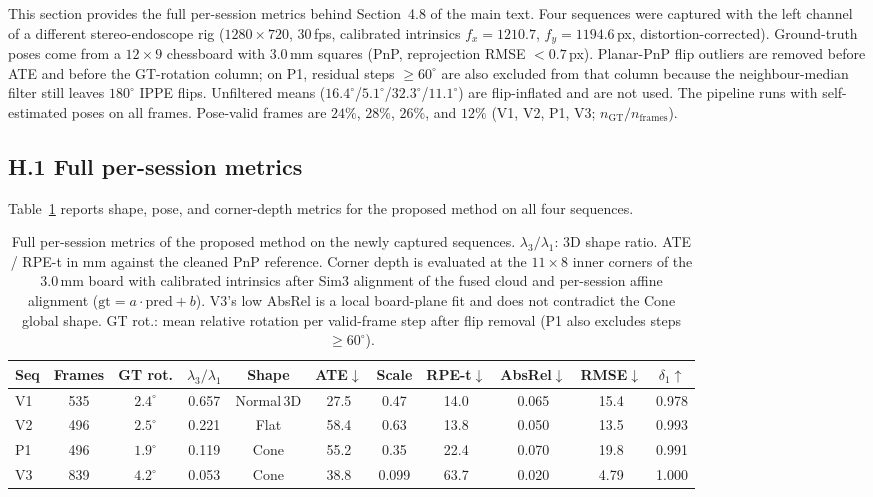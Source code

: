 \documentclass[review]{elsarticle}
\begin{document}
This section provides the full per-session metrics behind Section~4.8 of the main text. Four sequences were captured with the left channel of a different stereo-endoscope rig ($1280{\times}720$, 30\,fps, calibrated intrinsics $f_x{=}1210.7$, $f_y{=}1194.6$\,px, distortion-corrected). Ground-truth poses come from a $12{\times}9$ chessboard with $3.0$\,mm squares (PnP, reprojection RMSE ${<}0.7$\,px). Planar-PnP flip outliers are removed before ATE and before the GT-rotation column; on P1, residual steps ${\geq}60^{\circ}$ are also excluded from that column because the neighbour-median filter still leaves $180^{\circ}$ IPPE flips. Unfiltered means ($16.4^{\circ}$/$5.1^{\circ}$/$32.3^{\circ}$/$11.1^{\circ}$) are flip-inflated and are not used. The pipeline runs with self-estimated poses on all frames. Pose-valid frames are $24\%$, $28\%$, $26\%$, and $12\%$ (V1, V2, P1, V3; $n_{\mathrm{GT}}/n_{\mathrm{frames}}$).

\subsection*{H.1 Full per-session metrics}

Table~\ref{tab:supp_new_capture_full} reports shape, pose, and corner-depth metrics for the proposed method on all four sequences.

\begin{table}[h]
\centering
\caption{Full per-session metrics of the proposed method on the newly captured sequences. $\lambda_3/\lambda_1$: 3D shape ratio. ATE / RPE-t in mm against the cleaned PnP reference. Corner depth is evaluated at the $11{\times}8$ inner corners of the $3.0$\,mm board with calibrated intrinsics after Sim3 alignment of the fused cloud and per-session affine alignment ($\mathrm{gt}=a{\cdot}\mathrm{pred}+b$). V3's low AbsRel is a local board-plane fit and does not contradict the Cone global shape. GT rot.: mean relative rotation per valid-frame step after flip removal (P1 also excludes steps ${\geq}60^{\circ}$).}
\label{tab:supp_new_capture_full}
\setlength{\tabcolsep}{4pt}
\renewcommand{\arraystretch}{1.05}
\footnotesize
\begin{tabular}{l ccc ccc ccc c}
\toprule
Seq & Frames & GT rot. & $\lambda_3/\lambda_1$ & Shape & ATE$\downarrow$ & Scale & RPE-t$\downarrow$ & AbsRel$\downarrow$ & RMSE$\downarrow$ & $\delta_1$$\uparrow$ \\
\midrule
V1 & 535 & $2.4^{\circ}$ & 0.657 & Normal\,3D & 27.5 & 0.47 & 14.0 & 0.065 & 15.4 & 0.978 \\
V2 & 496 & $2.5^{\circ}$ & 0.221 & Flat & 58.4 & 0.63 & 13.8 & 0.050 & 13.5 & 0.993 \\
P1 & 496 & $1.9^{\circ}$ & 0.119 & Cone & 55.2 & 0.35 & 22.4 & 0.070 & 19.8 & 0.991 \\
V3 & 839 & $4.2^{\circ}$ & 0.053 & Cone & 38.8 & 0.099 & 63.7 & 0.020 & 4.79 & 1.000 \\
\bottomrule
\end{tabular}
\end{table}
\end{document}
